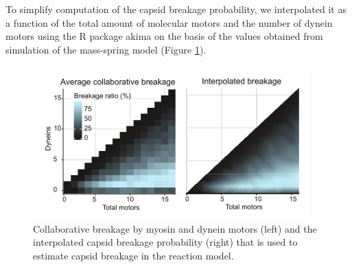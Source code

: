 To simplify computation of the capsid breakage probability, we interpolated it as a function of the total amount of molecular motors and the number of dynein motors using the R package akima on the basis of the values obtained from simulation of the mass-spring model (Figure \ref{figure:MassSpringInterpolation}).

\begin{figure}
\begin{center}
\includegraphics[width=0.95\textwidth, trim={0cm 0cm 0cm 0cm}, clip]{D_chapters/1_TugOfWar/SUPPLEMENTARYFIGURE1D.pdf}
\caption[Collaborative breakage by molecular motors and the interpolated capsid breakage probability]%
{Collaborative breakage by myosin and dynein motors (left) and the interpolated capsid breakage probability (right) that is used to estimate capsid breakage in the reaction model.}
\label{figure:MassSpringInterpolation}
\end{center}
\end{figure}